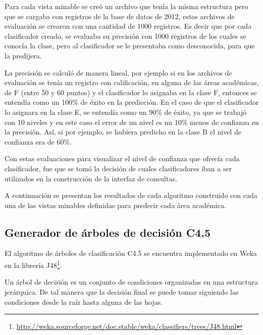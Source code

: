 Para cada vista minable se creó un archivo que tenía la misma estructura pero que se cargaba con registros de la base de datos de 2012, estos archivos de evaluación se crearon con una cantidad de 1000 registros. Es decir que por cada clasificador creado, se evaluaba su precisión con 1000 registros de los cuales se conocía la clase, pero al clasificador se le presentaba como desconocida, para que la predijera.

La precisión se calculó de manera lineal, por ejemplo si en los archivos de evaluación se tenía un registro con calificación, en alguna de las áreas académicas, de F (entre 50 y 60 puntos) y el clasificador lo asignaba en la clase F, entonces se entendía como un 100\% de éxito en la predicción. En el caso de que el clasificador lo asignara en la clase E, se entendía como un 90\% de éxito, ya que se trabajó con 10 niveles y en este caso el error de un nivel es un 10\% menos de confianza en la precisión. Así, si por ejemplo, se hubiera predicho en la clase B el nivel de confianza era de 60\%.

Con estas evaluaciones para visualizar el nivel de confianza que ofrecía cada clasificador, fue que se tomó la decisión de cuales clasificadores iban a ser utilizados en la construcción de la interfaz de consultas.

A continuación se presentan los resultados de cada algoritmo construido con cada una de las vistas minables definidas para predecir cada área académica.
\subsection{Generador de árboles de decisión C4.5}
El algoritmo de árboles de clasificación C4.5 se encuentra implementado en Weka en la librería J48\footnote{\url{http://weka.sourceforge.net/doc.stable/weka/classifiers/trees/J48.html}}.

Un árbol de decisión es un conjunto de condiciones organizadas en una estructura jerárquica. De tal manera que la decisión final se puede tomar siguiendo las condiciones desde la raíz hasta alguna de las hojas.

